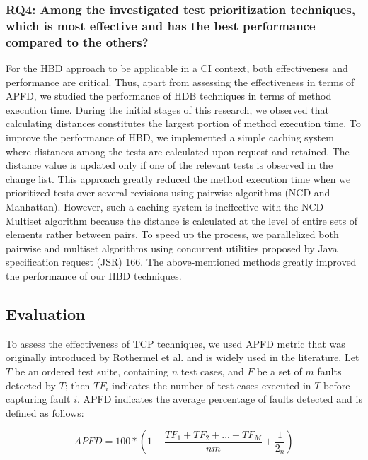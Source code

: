 \documentclass[1p]{elsarticle}
\begin{document}
\subsubsection{RQ4: Among the investigated test prioritization techniques, which is most effective and has the best performance compared to the others?}

For the HBD approach to be applicable in a CI context, both effectiveness and performance are critical. Thus, apart from assessing the effectiveness in terms of APFD, we studied the performance of HDB techniques in terms of method execution time. During the initial stages of this research, we observed that calculating distances constitutes the largest portion of method execution time. To improve the performance of HBD, we implemented a simple caching system where distances among the tests are calculated upon request and retained. The distance value is updated only if one of the relevant tests is observed in the change list. This approach greatly reduced the method execution time when we prioritized tests over several revisions using pairwise algorithms (NCD and Manhattan). However, such a caching system is ineffective with the NCD Multiset algorithm because the distance is calculated at the level of entire sets of elements rather between pairs. To speed up the process, we parallelized both pairwise and multiset algorithms using concurrent utilities proposed by Java specification request (JSR) 166. The above-mentioned methods greatly improved the performance of our HBD techniques.


\subsection{Evaluation}
\label{section_evaluation}
To assess the effectiveness of TCP techniques, we used APFD metric that was originally introduced by Rothermel et al. \cite{rothermel2001prioritizing} and is widely used in the literature. Let $T$ be an ordered test suite, containing $n$ test cases, and $F$ be a set of $m$ faults detected by $T$; then $TF_{i}$ indicates the number of test cases executed in $T$ before capturing fault $i$. APFD indicates the average percentage of faults detected and is defined as follows:

$$ APFD = 100 * (1- \frac{ TF_1 + TF_2 + ... + TF_M } { nm } + \frac{1} { 2_n }) $$
\end{document}
